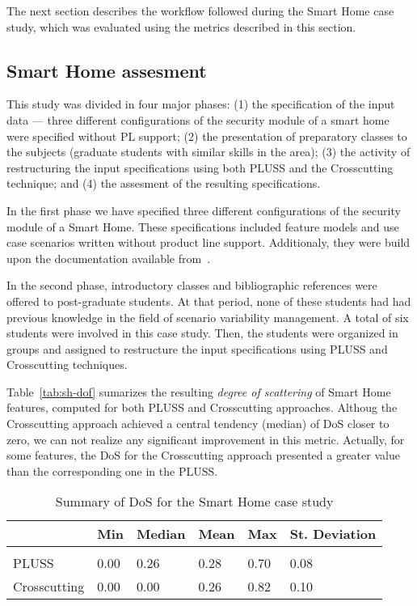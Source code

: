 The next section describes the workflow followed during the Smart Home
case study, which was evaluated using the metrics described in this section.

\subsection{Smart Home assesment}

This study was divided in four major phases: (1) the specification of the input
data --- three different configurations of the security module of a smart home
were specified without PL support; (2) the presentation of preparatory classes to the subjects
(graduate students with similar skills in the area); (3) the activity of
restructuring the input specifications using both PLUSS and the Crosscutting
technique; and (4) the assesment of the resulting specifications.

In the first phase we have specified three different configurations of the
security module of a Smart Home. These specifications included feature models and
use case scenarios written without product line support. Additionaly, they were
build upon the documentation available from~\cite{Pohl:2005aa,AMPLE}.

In the second phase, introductory classes and bibliographic references were
offered to post-graduate students. At that period, none of these students had
had previous knowledge in the field of scenario variability management. A total of six
students were involved in this case study. Then, the students were organized in
groups and assigned to restructure the input specifications using PLUSS and
Crosscutting techniques.

Table~\ref{tab:sh-dof} sumarizes the resulting \emph{degree of scattering} of
Smart Home features, computed for both PLUSS and Crosscutting approaches. Althoug the
Crosscutting approach achieved a central tendency (median) of DoS closer to
zero, we can not realize any significant improvement in this metric. Actually, for some
features, the DoS for the Crosscutting approach presented a greater value than
the corresponding one in the PLUSS.

\begin{table}[htb]
\centering
\caption{Summary of DoS for the Smart Home case study}
\label{tab:sh-dos}
\begin{small}
\begin{tabular}{llllll} \hline
					& Min 	& Median 	& Mean 	& Max 	& St. Deviation \\ \hline \\
	PLUSS			& 0.00  & 0.26   	& 0.28  & 0.70 	& 0.08 			\\
	Crosscutting	& 0.00  & 0.00  	& 0.26 	& 0.82 & 0.10  		\\ \hline	
\end{tabular}
\end{small}
\end{table}

